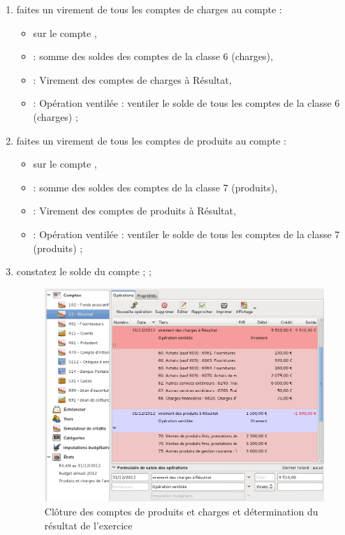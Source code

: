 \begin{enumerate}
	\item faites un virement de tous les comptes de charges au compte  :
		\begin{itemize}
			\item sur le compte ,
			\item {} : somme des soldes des comptes de la classe 6 (charges),					
			\item {} : Virement des comptes de charges à Résultat,
			\item {} : Opération ventilée : ventiler le solde de tous les comptes de la classe 6 (charges) ;
		\end{itemize}			
	\item faites un virement de tous les comptes de produits au compte  :
		\begin{itemize}
			\item sur le compte ,
			\item {} : somme des  soldes des comptes de la classe 7 (produits),					
			\item {} : Virement des comptes de produits à Résultat,
			\item {} : Opération ventilée : ventiler le solde de tous les comptes de la classe 7 (produits) ;
		\end{itemize}	
	\item constatez le solde du compte  \ifIllustration {}; 
	\else ;
	\fi  

\ifIllustration
\begin{figure}[p]
\begin{center}
\includegraphics[scale=0.5]{image/screenshot/asso_chargesProductsClosing}
\end{center}
\caption{Clôture des comptes de produits et charges et détermination du résultat de l'exercice}
\label{asso-chargesProductsClosing-img}
\end{figure}
\fi



\end{enumerate}
